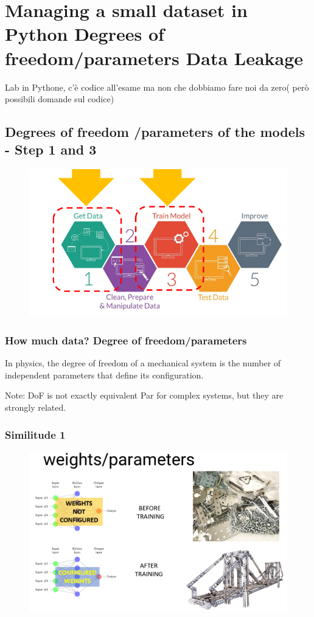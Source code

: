 \chapter{Managing a small dataset in Python Degrees of freedom/parameters Data Leakage}
Lab in Pythone, c'è codice all'esame ma non che dobbiamo fare noi da zero( però possibili domande sul codice)


\section{Degrees of freedom /parameters of the models - Step 1 and 3}


\begin{figure}[H]
    \centering
    \includegraphics[width=0.8\linewidth]{07-08/images/step 1 and 3.png}
\end{figure}

\subsection{How much data? Degree of freedom/parameters}
\noindent In physics, the degree of freedom of a mechanical system is the number of independent parameters that define its configuration.

\noindent Note: DoF is not exactly equivalent Par for complex systems, but they are strongly related.

\subsection{Similitude 1}
\begin{figure}[H]
    \centering
    \includegraphics[width=0.8\linewidth]{07-08/images/similitude 1.png}
\end{figure}

